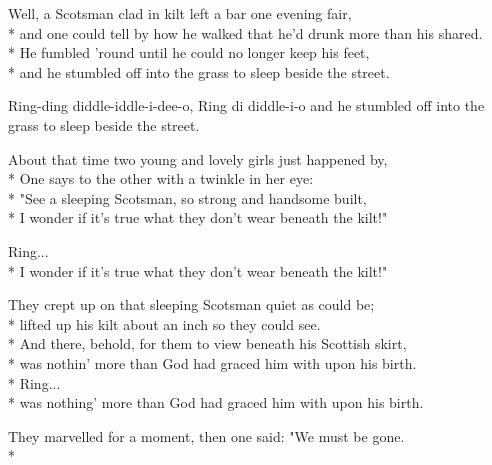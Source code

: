 \pagestyle{Längre sånger}
\begin{SongText}
    \begin{SongVerse}
        Well, a Scotsman clad in kilt left a bar one evening fair,\\*%
        and one could tell by how he walked that he'd drunk more than his shared.\\*%
        He fumbled 'round until he could no longer keep his feet,\\*%
        and he stumbled off into the grass to sleep beside the street.
    \end{SongVerse}
    \begin{SongVerse}
        Ring-ding diddle-iddle-i-dee-o, Ring di diddle-i-o
        and he stumbled off into the grass to sleep beside the street.
    \end{SongVerse}
    \begin{SongVerse}
        About that time two young and lovely girls just happened by,\\*%
        One says to the other with a twinkle in her eye:\\*%
        "See a sleeping Scotsman, so strong and handsome built,\\*%
        I wonder if it's true what they don't wear beneath the kilt!"
    \end{SongVerse}
    \begin{SongVerse}
        Ring...\\*%
        I wonder if it's true what they don't wear beneath the kilt!"
    \end{SongVerse}
    \begin{SongVerse}
        They crept up on that sleeping Scotsman quiet as could be;\\*%
        lifted up his kilt about an inch so they could see.\\*%
        And there, behold, for them to view beneath his Scottish skirt,\\*%
        was nothin' more than God had graced him with upon his birth. \\*%
        Ring...\\*%
        was nothing' more than God had graced him with upon his birth.
    \end{SongVerse}
    \begin{SongVerse}
        They marvelled for a moment, then one said: "We must be gone.\\*%

\end{SongVerse}
\end{SongText}

